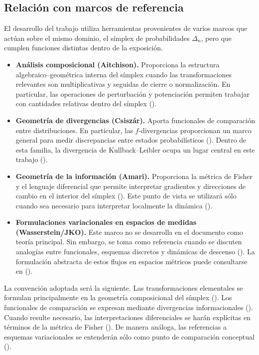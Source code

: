 \documentclass[12pt]{article}
\begin{document}
\subsection*{Relación con marcos de referencia}

El desarrollo del trabajo utiliza herramientas provenientes de varios marcos que actúan sobre el mismo dominio, el símplex de probabilidades $\Delta_n$, pero que cumplen funciones distintas dentro de la exposición.

\begin{itemize}
    \item \textbf{Análisis composicional (Aitchison).} Proporciona la estructura algebraico--geométrica interna del símplex cuando las transformaciones relevantes son multiplicativas y seguidas de cierre o normalización. En particular, las operaciones de perturbación y potenciación permiten trabajar con cantidades relativas dentro del símplex (\cite{Aitchison1986}).

    \item \textbf{Geometría de divergencias (Csiszár).} Aporta funcionales de comparación entre distribuciones. En particular, las $f$-divergencias proporcionan un marco general para medir discrepancias entre estados probabilísticos (\cite{Csiszar1975}). Dentro de esta familia, la divergencia de Kullback--Leibler ocupa un lugar central en este trabajo (\cite{KullbackLeibler1951}).

    \item \textbf{Geometría de la información (Amari).} Proporciona la métrica de Fisher y el lenguaje diferencial que permite interpretar gradientes y direcciones de cambio en el interior del símplex (\cite{AmariNagaoka2000}). Este punto de vista se utilizará sólo cuando sea necesario para interpretar localmente la dinámica (\cite{Amari2016}).

    \item \textbf{Formulaciones variacionales en espacios de medidas (Wasserstein/JKO).} Este marco no se desarrolla en el documento como teoría principal. Sin embargo, se toma como referencia cuando se discuten analogías entre funcionales, esquemas discretos y dinámicas de descenso (\cite{JordanKinderlehrerOtto1998}). La formulación abstracta de estos flujos en espacios métricos puede consultarse en (\cite{AmbrosioGigliSavare2005}).
\end{itemize}

La convención adoptada será la siguiente. Las transformaciones elementales se formulan principalmente en la geometría composicional del símplex (\cite{Aitchison1986}). Los funcionales de comparación se expresan mediante divergencias informacionales (\cite{Csiszar1975}). Cuando resulte necesario, las interpretaciones diferenciales se harán explícitas en términos de la métrica de Fisher (\cite{Amari2016}). De manera análoga, las referencias a esquemas variacionales se entenderán sólo como punto de comparación conceptual (\cite{JordanKinderlehrerOtto1998}).
\end{document}
